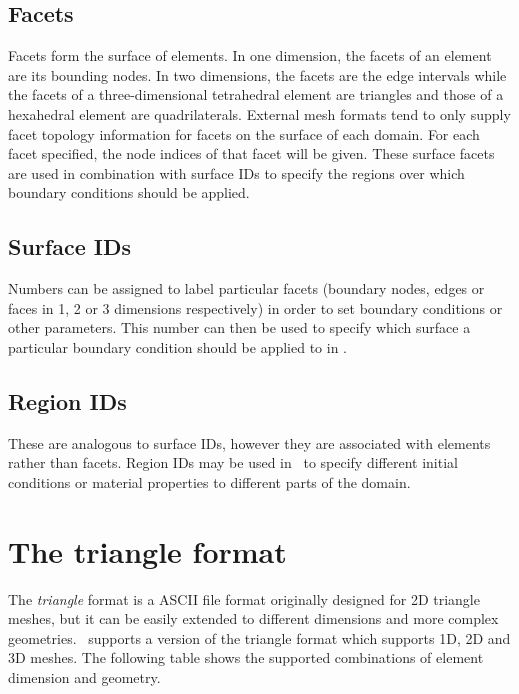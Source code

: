 \subsection{Facets}

Facets form the surface of elements. In one dimension, the facets of an
element are its bounding nodes. In two dimensions, the facets are the edge
intervals while the facets of a three-dimensional tetrahedral element are
triangles and those of a hexahedral element are quadrilaterals. External
mesh formats tend to only supply facet topology information for facets on
the surface of each domain. For each facet specified, the node indices of
that facet will be given. These surface facets are used in combination with
surface IDs to specify the regions over which boundary conditions should be
applied.

\subsection{Surface IDs}\label{sect:surface_ids}
Numbers can be assigned to label particular facets (boundary nodes, edges or
faces in 1, 2 or 3 dimensions respectively) in order to set
boundary conditions or other parameters. This number can then be used to
specify which surface a particular boundary condition should be applied to
in \fluidity. 

\subsection{Region IDs}\label{sect:region_ids}
 These are analogous to surface IDs, however they are
associated with elements rather than facets. Region IDs may be used in
\fluidity\ to specify different initial conditions or material properties to
different parts of the domain.



\section{The triangle format}\label{sect:triangle_format}

The \emph{triangle} format is a ASCII file format originally designed for 2D
triangle meshes, but it can be easily extended to different dimensions and
more complex geometries.  \fluidity\ supports a version of the triangle format
which supports 1D, 2D and 3D meshes.  The following table shows the supported
combinations of element dimension and geometry.

